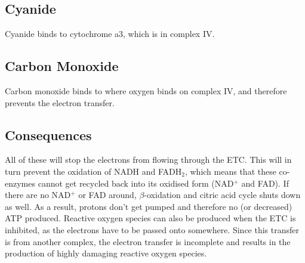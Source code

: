 \subsection{Cyanide}

Cyanide binds to cytochrome a3, which is in complex IV.

\subsection{Carbon Monoxide}

Carbon monoxide binds to where oxygen binds on complex IV, and therefore prevents the electron transfer.

\subsection{Consequences}

All of these will stop the electrons from flowing through the ETC.
This will in turn prevent the oxidation of NADH and FADH$_2$, which means that these co-enzymes cannot get recycled back into its oxidised form (NAD$^+$ and FAD).
If there are no NAD$^+$ or FAD around, $\beta$-oxidation and citric acid cycle shuts down as well.
As a result, protons don't get pumped and therefore no (or decreased) ATP produced.
Reactive oxygen species can also be produced when the ETC is inhibited, as the electrons have to be passed onto somewhere.
Since this transfer is from another complex, the electron transfer is incomplete and results in the production of highly damaging reactive oxygen species.

